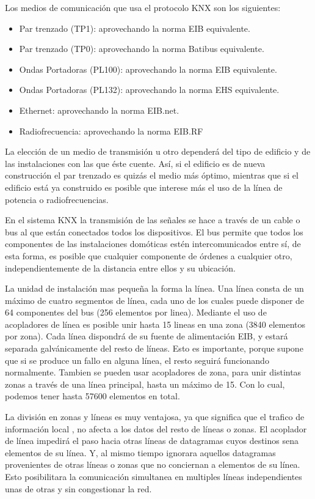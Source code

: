 Los medios de comunicación que usa el protocolo KNX son los siguientes: 
\begin{itemize}
	\item Par trenzado (TP1): aprovechando la norma EIB equivalente.
	\item Par trenzado (TP0): aprovechando la norma Batibus equivalente. 
	\item Ondas Portadoras (PL100): aprovechando la norma EIB equivalente.
	\item Ondas Portadoras (PL132): aprovechando la norma EHS equivalente. 
	\item Ethernet: aprovechando la norma EIB.net. 
	\item Radiofrecuencia: aprovechando la norma EIB.RF
\end{itemize}
La elección de un medio de transmisión u otro depender\'a del tipo de edificio y de las instalaciones con las que éste cuente. Así, si el edificio es de nueva construcción el par trenzado es quiz\'as el medio m\'as óptimo, mientras que si el edificio est\'a ya construido es posible que interese m\'as el uso de la línea de potencia o radiofrecuencias.


En el sistema KNX la transmisión de las señales se hace a través de un cable o bus al que est\'an conectados todos los dispositivos. El bus permite que todos los componentes de las instalaciones domóticas estén intercomunicados entre sí, de esta forma, es posible que cualquier componente de órdenes a cualquier otro, independientemente de la distancia entre ellos y su ubicación. 


La unidad de instalación mas pequeña la forma la línea. Una línea consta de un m\'aximo de cuatro segmentos de línea, cada uno de los cuales puede disponer de 64 componentes del bus (256 elementos por linea). Mediante el uso de acopladores de línea es posible unir hasta 15 lineas en una zona (3840 elementos por zona). Cada línea dispondr\'a de su fuente de alimentación EIB, y estar\'a separada galv\'anicamente del resto de líneas. Esto es importante, porque supone que si se produce un fallo en alguna línea, el resto seguir\'a funcionando normalmente. Tambien se pueden usar acopladores de zona, para unir distintas zonas a través de una línea principal, hasta un m\'aximo de 15. Con lo cual, podemos tener hasta 57600 elementos en total.

La división en zonas y líneas es muy ventajosa, ya que significa que el trafico de información local , no afecta a los datos del resto de líneas o zonas. El acoplador de línea impedir\'a el paso hacia otras líneas de datagramas cuyos destinos sena elementos de su línea. Y, al mismo tiempo ignorara aquellos datagramas provenientes de otras líneas o zonas que no conciernan a elementos de su línea. Esto posibilitara la comunicación simultanea en multiples líneas independientes unas de otras y sin congestionar la red.


